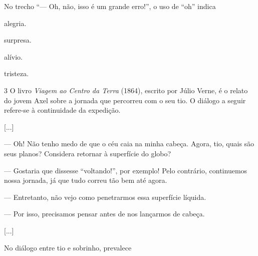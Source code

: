 No trecho ``--- Oh, não, isso é um grande erro!'', o uso de ``oh'' indica

\begin{escolha}
\item alegria.

\item surpresa.

\item alívio.

\item tristeza.
\end{escolha}

\num{3} O livro \textit{Viagem ao Centro da Terra} (1864), escrito por Júlio Verne, é o relato do jovem Axel sobre a jornada que
percorreu com o seu tio. O diálogo a seguir refere-se à continuidade da expedição.

\begin{myquote}
{[}...{]}

--- Oh! Não tenho medo de que o céu caia na minha cabeça.
Agora, tio, quais são seus planos? Considera retornar à superfície do globo?

--- Gostaria que dissesse ``voltando!'', por exemplo! 
Pelo contrário, continuemos nossa jornada, já que tudo correu tão bem até agora.

--- Entretanto, não vejo como penetrarmos essa superfície líquida.

--- Por isso, precisamos pensar antes de nos lançarmos de cabeça.

[...]

\end{myquote}

No diálogo entre tio e sobrinho, prevalece

